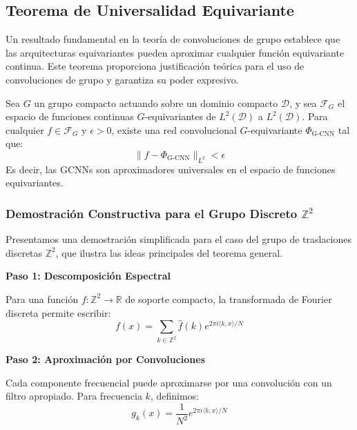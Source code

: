 \subsection{Teorema de Universalidad Equivariante}\label{subsec:teorema_universalidad_equivariante}

Un resultado fundamental en la teoría de convoluciones de grupo establece que las arquitecturas equivariantes pueden aproximar cualquier función equivariante continua. Este teorema proporciona justificación teórica para el uso de convoluciones de grupo y garantiza su poder expresivo.

\begin{theorem}\label{theorem:equivariant_universality_cnns}
    Sea $G$ un grupo compacto actuando sobre un dominio compacto $\mathcal{D}$, y sea $\mathcal{F}_G$ el espacio de funciones continuas $G$-equivariantes de $L^2(\mathcal{D})$ a $L^2(\mathcal{D})$. Para cualquier $f \in \mathcal{F}_G$ y $\epsilon > 0$, existe una red convolucional $G$-equivariante $\Phi_{\text{G-CNN}}$ tal que:
    \begin{equation}
        \|f - \Phi_{\text{G-CNN}}\|_{L^2} < \epsilon
    \end{equation}
    Es decir, las \glspl{GCNN} son aproximadores universales en el espacio de funciones equivariantes.
\end{theorem}

\subsubsection{Demostración Constructiva para el Grupo Discreto $\mathbb{Z}^2$}

Presentamos una demostración simplificada para el caso del grupo de traslaciones discretas $\mathbb{Z}^2$, que ilustra las ideas principales del teorema general.

\textbf{Paso 1: Descomposición Espectral}

Para una función $f: \mathbb{Z}^2 \to \mathbb{R}$ de soporte compacto, la transformada de Fourier discreta permite escribir:
\begin{equation}
    f(x) = \sum_{k \in \mathbb{Z}^2} \hat{f}(k) e^{2\pi i \langle k, x \rangle / N}
\end{equation}

\textbf{Paso 2: Aproximación por Convoluciones}

Cada componente frecuencial puede aproximarse por una convolución con un filtro apropiado. Para frecuencia $k$, definimos:
\begin{equation}
    g_k(x) = \frac{1}{N^2} e^{2\pi i \langle k, x \rangle / N}
\end{equation}


